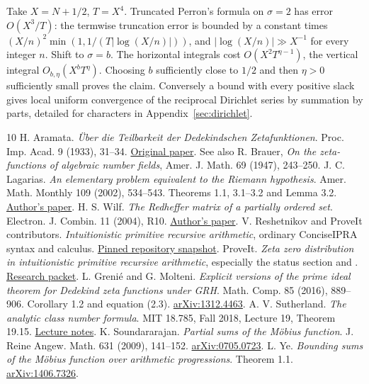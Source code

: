 \documentclass[11pt]{article}
\begin{document}
Take \(X=N+1/2\), \(T=X^4\). Truncated Perron's formula on \(\sigma=2\) has error \(O(X^3/T)\): the termwise truncation error is bounded by a constant times \((X/n)^2\min(1,1/(T|\log(X/n)|))\), and \(|\log(X/n)|\gg X^{-1}\) for every integer \(n\). Shift to \(\sigma=b\). The horizontal integrals cost \(O(X^2 T^{\eta-1})\), the vertical integral \(O_{b,\eta}(X^bT^\eta)\). Choosing \(b\) sufficiently close to \(1/2\) and then \(\eta>0\) sufficiently small proves the claim. Conversely a bound with every positive slack gives local uniform convergence of the reciprocal Dirichlet series by summation by parts, detailed for characters in Appendix~\ref{sec:dirichlet}.


\begin{thebibliography}{10}\small
{} H. Aramata. \emph{\"Uber die Teilbarkeit der Dedekindschen Zetafunktionen}. Proc. Imp. Acad. 9 (1933), 31--34. \href{https://doi.org/10.3792/pia/1195580866}{Original paper}. See also R. Brauer, \emph{On the zeta-functions of algebraic number fields}, Amer. J. Math. 69 (1947), 243--250.
 J. C. Lagarias. \emph{An elementary problem equivalent to the Riemann hypothesis}. Amer. Math. Monthly 109 (2002), 534--543. Theorems 1.1, 3.1--3.2 and Lemma 3.2. \href{https://arxiv.org/abs/math/0008177}{Author's paper}.
 H. S. Wilf. \emph{The Redheffer matrix of a partially ordered set}. Electron. J. Combin. 11 (2004), R10. \href{https://arxiv.org/abs/math/0408263}{Author's paper}.
 V. Reshetnikov and ProveIt contributors. \emph{Intuitionistic primitive recursive arithmetic}, ordinary ConciseIPRA syntax and calculus. \href{https://github.com/VladimirReshetnikov/ProveIt/tree/ce0e3ceaf41a83e653857e5f60e0460733cc230c/Logic/PrimitiveRecursiveArithmetic}{Pinned repository snapshot}.
 ProveIt. \emph{Zeta zero distribution in intuitionistic primitive recursive arithmetic}, especially the status section and . \href{https://github.com/VladimirReshetnikov/ProveIt/tree/ce0e3ceaf41a83e653857e5f60e0460733cc230c/Logic/PrimitiveRecursiveArithmetic/docs/proofs/analytic-number-theory/zeta_zeros_ipra_2026-11-15}{Research packet}.
 L. Greni\'e and G. Molteni. \emph{Explicit versions of the prime ideal theorem for Dedekind zeta functions under GRH}. Math. Comp. 85 (2016), 889--906. Corollary 1.2 and equation (2.3). \href{https://arxiv.org/abs/1312.4463}{arXiv:1312.4463}.
 A. V. Sutherland. \emph{The analytic class number formula}. MIT 18.785, Fall 2018, Lecture 19, Theorem 19.15. \href{https://math.mit.edu/classes/18.785/2018fa/LectureNotes19.pdf}{Lecture notes}.
 K. Soundararajan. \emph{Partial sums of the M\"obius function}. J. Reine Angew. Math. 631 (2009), 141--152. \href{https://arxiv.org/abs/0705.0723}{arXiv:0705.0723}.
 L. Ye. \emph{Bounding sums of the M\"obius function over arithmetic progressions}. Theorem 1.1. \href{https://arxiv.org/abs/1406.7326}{arXiv:1406.7326}.
\end{thebibliography}
\end{document}

